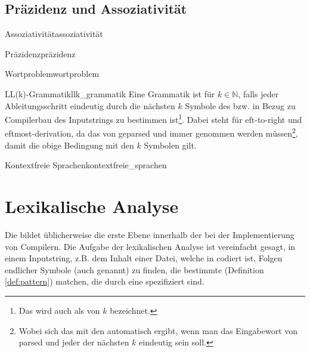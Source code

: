 \subsection{Präzidenz und Assoziativität}
\begin{Definition}{Assoziativität}{assoziativität}
\end{Definition}
\begin{Definition}{Präzidenz}{präzidenz}
\end{Definition}
\begin{Definition}{Wortproblem}{wortproblem}
\end{Definition}
\begin{Definition}{LL(k)-Grammatik}{llk_grammatik}
  Eine Grammatik ist  für $k\in\mathbb{N}$, falls jeder Ableitungsschritt eindeutig durch die nächsten $k$ Symbole des  bzw. in Bezug zu Compilerbau  des Inputstrings zu bestimmen ist\footnote{Das wird auch als  von $k$ bezeichnet.}. Dabei steht  für eft-to-right und eftmost-derivation, da das  von  geparsed und immer  genommen werden müssen\footnote{Wobei sich das mit den  automatisch ergibt, wenn man das Eingabewort von   parsed und jeder der nächsten $k$  eindeutig sein soll.}, damit die obige Bedingung mit den  $k$ Symbolen gilt.
\end{Definition}
\begin{Definition}{Kontextfreie Sprachen}{kontextfreie_sprachen}
\end{Definition}
\section{Lexikalische Analyse}
\label{sec:lexikalische_analyse}

Die  bildet üblicherweise die erste Ebene innerhalb der  bei der Implementierung von Compilern. Die Aufgabe der lexikalischen Analyse ist vereinfacht gesagt, in einem Inputstring, z.B. dem Inhalt einer Datei, welche in  codiert ist, Folgen endlicher Symbole (auch  genannt) zu finden, die bestimmte  (Definition \ref{def:pattern}) matchen, die durch eine  spezifiziert sind.

